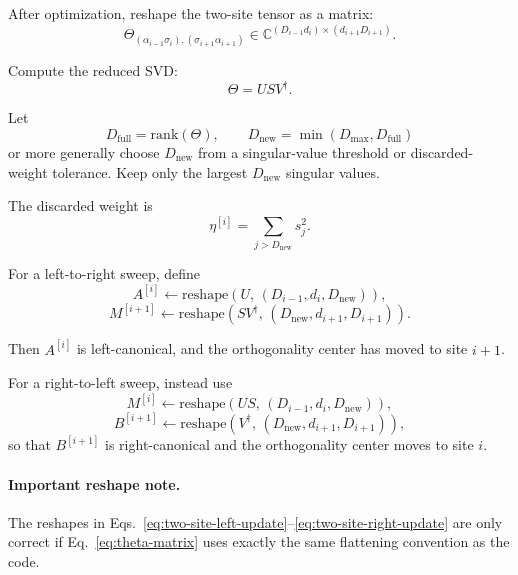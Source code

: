 \documentclass[aps,prb,onecolumn,nofootinbib]{revtex4-2}
\begin{document}
	After optimization, reshape the two-site tensor as a matrix:
	\begin{equation}
		\Theta_{(\alpha_{i-1}\sigma_i),(\sigma_{i+1}\alpha_{i+1})}
		\in \mathbb{C}^{(D_{i-1}d_i)\times(d_{i+1}D_{i+1})}.
		\label{eq:theta-matrix}
	\end{equation}
	
	Compute the reduced SVD:
	\begin{equation}
		\Theta = U S V^\dagger.
		\label{eq:theta-svd}
	\end{equation}
	
	Let
	\[
	D_{\mathrm{full}} = \mathrm{rank}(\Theta),\qquad
	D_{\mathrm{new}} = \min(D_{\max}, D_{\mathrm{full}})
	\]
	or more generally choose $D_{\mathrm{new}}$ from a singular-value threshold or discarded-weight tolerance. Keep only the largest $D_{\mathrm{new}}$ singular values.
	
	The discarded weight is
	\begin{equation}
		\eta^{[i]} = \sum_{j>D_{\mathrm{new}}} s_j^2.
		\label{eq:discarded-weight}
	\end{equation}
	
	For a left-to-right sweep, define
	\begin{equation}
		A^{[i]} \leftarrow \mathrm{reshape}\!\left(U,\,(D_{i-1},d_i,D_{\mathrm{new}})\right),
		\label{eq:two-site-left-update}
	\end{equation}
	\begin{equation}
		M^{[i+1]} \leftarrow \mathrm{reshape}\!\left(SV^\dagger,\,(D_{\mathrm{new}},d_{i+1},D_{i+1})\right).
		\label{eq:two-site-center-right}
	\end{equation}
	
	Then $A^{[i]}$ is left-canonical, and the orthogonality center has moved to site $i+1$.
	
	For a right-to-left sweep, instead use
	\begin{equation}
		M^{[i]} \leftarrow \mathrm{reshape}\!\left(US,\,(D_{i-1},d_i,D_{\mathrm{new}})\right),
		\label{eq:two-site-center-left}
	\end{equation}
	\begin{equation}
		B^{[i+1]} \leftarrow \mathrm{reshape}\!\left(V^\dagger,\,(D_{\mathrm{new}},d_{i+1},D_{i+1})\right),
		\label{eq:two-site-right-update}
	\end{equation}
	so that $B^{[i+1]}$ is right-canonical and the orthogonality center moves to site $i$.
	
	\paragraph{Important reshape note.}
	The reshapes in Eqs.~\eqref{eq:two-site-left-update}--\eqref{eq:two-site-right-update} are only correct if Eq.~\eqref{eq:theta-matrix} uses exactly the same flattening convention as the code.
	
\end{document}
